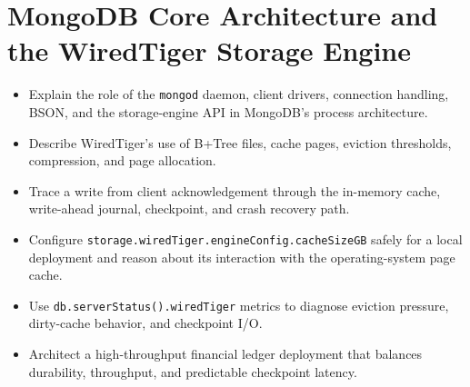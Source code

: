 \chapter{MongoDB Core Architecture and the WiredTiger Storage Engine}
%

\begin{objectives}
\begin{itemize}
    \item Explain the role of the \texttt{mongod} daemon, client drivers, connection handling, BSON, and the storage-engine API in MongoDB's process architecture.
    \item Describe WiredTiger's use of B+Tree files, cache pages, eviction thresholds, compression, and page allocation.
    \item Trace a write from client acknowledgement through the in-memory cache, write-ahead journal, checkpoint, and crash recovery path.
    \item Configure \texttt{storage.wiredTiger.engineConfig.cacheSizeGB} safely for a local deployment and reason about its interaction with the operating-system page cache.
    \item Use \texttt{db.serverStatus().wiredTiger} metrics to diagnose eviction pressure, dirty-cache behavior, and checkpoint I/O.
    \item Architect a high-throughput financial ledger deployment that balances durability, throughput, and predictable checkpoint latency.
\end{itemize}
\end{objectives}

